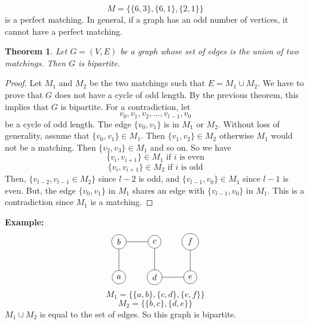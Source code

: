 \documentclass[openany]{report}
\newtheorem{theorem}{Theorem}[section]
\begin{document}
\[M = \{\{6,3\}, \{6,1\},\{2,1\} \}\]
is a perfect matching. In general, if a graph has an odd number of vertices, it cannot have a perfect matching. 
\begin{theorem}
    Let $G = (V,E)$ be a graph whose set of edges is the union of two matchings. Then $G$ is bipartite. 
\end{theorem}
\begin{proof}
    Let $M_1$ and $M_2$ be the two matchings such that $E = M_1 \cup M_2$. We have to prove that $G$ does not have a cycle of odd length. By the previous theorem, this implies that $G$ is bipartite. For a contradiction, let 
    \[v_0, v_1, v_2, \ldots, v_{l-1}, v_0\]
    be a cycle of odd length. The edge $\{v_0, v_1\}$ is in $M_1$ or $M_2$. Without loss of generality, assume that $\{v_0, v_1\} \in M_1$. Then $\{v_1,v_2\} \in M_2$ otherwise $M_1$ would not be a matching. Then $\{v_2,v_3\} \in M_1$ and so on. So we have 
    \[\{v_i, v_{i+1}\} \in M_1 \text{ if $i$ is even}\]
    \[\{v_i, v_{i+1}\} \in M_2 \text{ if $i$ is odd}\]
    Then, $\{v_{l-2}, v_{l-1} \in M_2\}$ since $l -2$ is odd, and $\{v_{l-1}, v_0\} \in M_1$ since $l-1$ is even. But, the edge $\{v_0, v_1\}$ in $M_1$ shares an edge with $\{v_{l-1}, v_0\}$ in $M_1$. This is a contradiction since $M_1$ is a matching.
\end{proof}
\noindent
\textbf{Example:}
\[
    \begin{tikzpicture}[node distance={15mm}, main/.style ={draw, circle}]
        \node[main] (1) {$a$};
        \node[main] (2) [above of=1] {$b$};
        \node[main] (3) [right of=2] {$c$};
        \node[main] (4) [below of=3] {$d$};
        \node[main] (5) [right of=4] {$e$};
        \node[main] (6) [above of=5] {$f$};
        \draw (1) -- (2);
        \draw (2) -- (3);
        \draw (3) -- (4);
        \draw (4)--(5);
        \draw (5)--(6);
    \end{tikzpicture}
\]
\[M_1 = \{\{a,b\}, \{c,d\}, \{e,f\}\}\]
\[M_2 = \{\{b,c\}, \{d,e\}\}\]
$M_1 \cup M_2$ is equal to the set of edges. So this graph is bipartite. 
\end{document}
